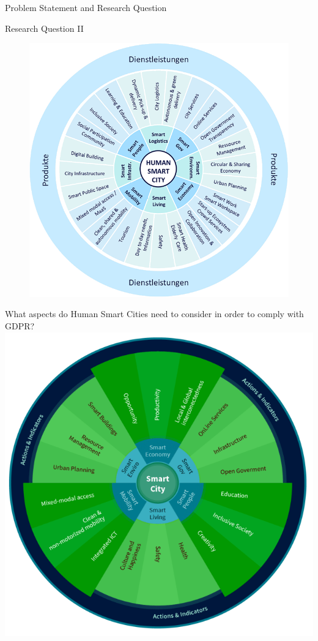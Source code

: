 \documentclass{beamer}
\begin{document}
\begin{frame}{Problem Statement and Research Question}
	\vspace{1cm}
	\begin{block}{Research Question II}
		\begin{figure}
			\vspace{-2cm} \hspace{-0.4cm}
			\includegraphics[width=1.2\linewidth]{Smart_City_Wheel_extended.png}
		\end{figure}
		What aspects do Human Smart Cities need to consider in order to comply with GDPR? \\
		\includegraphics[scale=0.2]{Smart_City_Wheel.png}
	\end{block}
\end{frame}
\end{document}
